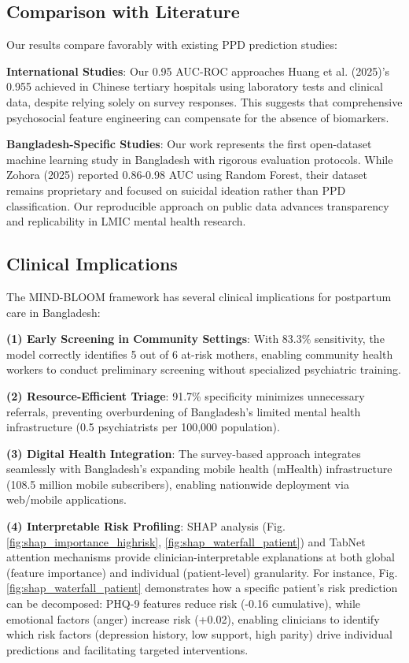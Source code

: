 \subsection{Comparison with Literature}

Our results compare favorably with existing PPD prediction studies:

\textbf{International Studies}: Our 0.95 AUC-ROC approaches Huang et al. (2025)'s 0.955 achieved in Chinese tertiary hospitals using laboratory tests and clinical data, despite relying solely on survey responses. This suggests that comprehensive psychosocial feature engineering can compensate for the absence of biomarkers.

\textbf{Bangladesh-Specific Studies}: Our work represents the first open-dataset machine learning study in Bangladesh with rigorous evaluation protocols. While Zohora (2025) reported 0.86-0.98 AUC using Random Forest, their dataset remains proprietary and focused on suicidal ideation rather than PPD classification. Our reproducible approach on public data advances transparency and replicability in LMIC mental health research.

\subsection{Clinical Implications}

The MIND-BLOOM framework has several clinical implications for postpartum care in Bangladesh:

\textbf{(1) Early Screening in Community Settings}: With 83.3\% sensitivity, the model correctly identifies 5 out of 6 at-risk mothers, enabling community health workers to conduct preliminary screening without specialized psychiatric training.

\textbf{(2) Resource-Efficient Triage}: 91.7\% specificity minimizes unnecessary referrals, preventing overburdening of Bangladesh's limited mental health infrastructure (0.5 psychiatrists per 100,000 population).

\textbf{(3) Digital Health Integration}: The survey-based approach integrates seamlessly with Bangladesh's expanding mobile health (mHealth) infrastructure (108.5 million mobile subscribers), enabling nationwide deployment via web/mobile applications.

\textbf{(4) Interpretable Risk Profiling}: SHAP analysis (Fig. \ref{fig:shap_importance_highrisk}, \ref{fig:shap_waterfall_patient}) and TabNet attention mechanisms provide clinician-interpretable explanations at both global (feature importance) and individual (patient-level) granularity. For instance, Fig. \ref{fig:shap_waterfall_patient} demonstrates how a specific patient's risk prediction can be decomposed: PHQ-9 features reduce risk (-0.16 cumulative), while emotional factors (anger) increase risk (+0.02), enabling clinicians to identify which risk factors (depression history, low support, high parity) drive individual predictions and facilitating targeted interventions.

